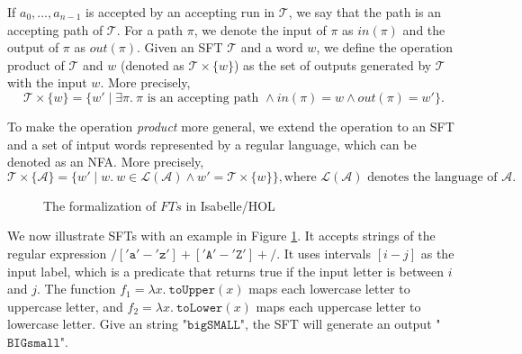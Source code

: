 \documentclass[a4paper,UKenglish,cleveref, autoref, thm-restate]{lipics-v2021}
\begin{document}
If $a_0,\ldots,a_{n-1}$ is accepted by an accepting run in $\mathcal{T}$, we say that the path is an accepting path of $\mathcal{T}$.
For a path $\pi$, we denote the input of $\pi$ as $in(\pi)$ and the output of $\pi$ as $out(\pi)$.
%
Given an SFT $\mathcal{T}$ and a word $w$, we define the operation product of $\mathcal{T}$ and $w$ (denoted as $\mathcal{T}\times\{w\}$) as the set of outputs generated by $\mathcal{T}$ with the input $w$. More precisely, 
\[
\mathcal{T}\times\{w\} = \{w'\mid \exists \pi.~\pi \text{ is an accepting path }\land in(\pi) = w \land out(\pi) = w'\}.
\]

To make the operation \emph{product} more general, we extend the operation to an SFT and a set of intput words represented by a regular language, which can be denoted as an NFA. More precisely,
\[
\mathcal{T}\times\{\mathcal{A}\} = \{w'\mid w.~w\in \mathcal{L}(\mathcal{A})\land w' = \mathcal{T}\times\{w\} \}, \text{where $\mathcal{L}(\mathcal{A})$ denotes the language of $\mathcal{A}$}.
\] 

\begin{figure}[hbt!]
  \centering
    \caption{The formalization of $FTs$ in Isabelle/HOL}
    \label{fig-example-ft}
    \end{figure}   
We now illustrate SFTs with an example in Figure \ref{fig-example-ft}. It accepts strings of the regular expression $/['\texttt{a}'-'\texttt{z}']+['\texttt{A}'-'\texttt{Z}']+/$. 
It uses intervals $[i-j]$ as the input label, which is a predicate that returns true if the input letter is between $i$ and $j$.
The function $f_1=\lambda x.~ \texttt{toUpper}(x)$ maps each lowercase letter to uppercase letter, and $f_2=\lambda x.~\texttt{toLower}(x)$ maps each uppercase letter to lowercase letter.
Give an string "$\texttt{bigSMALL}$", the SFT will generate an output "$\texttt{BIGsmall}$". 
\end{document}
